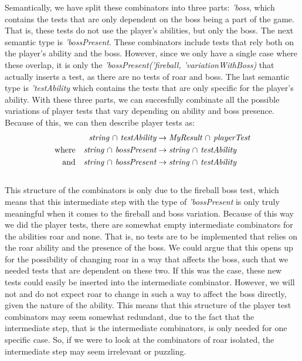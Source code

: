 Semantically, we have split these combinators into three parts: \textit{'boss}, which contains the tests that are only dependent on the boss being a part of the game. That is, these tests do not use the player's abilities, but only the boss. The next semantic type is \textit{'bossPresent}. These combinators include tests that rely both on the player's ability and the boss. However, since we only have a single case where these overlap, it is only the \textit{'bossPresent('fireball, 'variationWithBoss)} that actually inserts a test, as there are no tests of roar and boss. The last semantic type is \textit{'testAbility} which contains the tests that are only specific for the player's ability. With these three parts, we can succesfully combinate all the possible variations of player tests that vary depending on ability and boss presence. Because of this, we can then describe player tests as: 
\begin{align*}
	\textit{string $\cap$ testAbility} &\to \textit{MyResult $\cap$ playerTest} \\
	\text{where\quad} \textit{string $\cap$ bossPresent} &\to \textit{string $\cap$ testAbility} \\
	\text{and\quad} \textit{string $\cap$ bossPresent} &\to \textit{string $\cap$ testAbility}
\end{align*}
\\
This structure of the combinators is only due to the fireball boss test, which means that this intermediate step with the type of \textit{'bossPresent} is only truly meaningful when it comes to the fireball and boss variation. Because of this way we did the player tests, there are somewhat empty intermediate combinators for the abilities roar and none. That is, no tests are to be implemented that relies on the roar ability and the presence of the boss. We could argue that this opens up for the possibility of changing roar in a way that affects the boss, such that we needed tests that are dependent on these two. If this was the case, these new tests could easily be inserted into the intermediate combinator. However, we will not and do not expect roar to change in such a way to affect the boss directly, given the nature of the ability. This means that this structure of the player test combinators may seem somewhat redundant, due to the fact that the intermediate step, that is the intermediate combinators, is only needed for one specific case. So, if we were to look at the combinators of roar isolated, the intermediate step may seem irrelevant or puzzling.